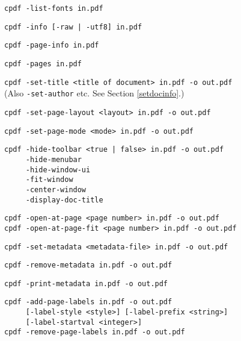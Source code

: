 \documentclass{book}
\begin{document}
  \begin{framed}
    \small\noindent\verb!cpdf -list-fonts in.pdf!

    \vspace{1.5mm}
    \small\noindent\verb!cpdf -info [-raw | -utf8] in.pdf!

    \vspace{1.5mm}
    \small\noindent\verb!cpdf -page-info in.pdf!

    \vspace{1.5mm}
    \small\noindent\verb!cpdf -pages in.pdf!

    \vspace{1.5mm}
    \small\noindent\verb!cpdf -set-title <title of document> in.pdf -o out.pdf!\\
    (Also \texttt{-set-author} etc. See Section \ref{setdocinfo}.)

    \vspace{1.5mm}
    \small\noindent\verb!cpdf -set-page-layout <layout> in.pdf -o out.pdf!

    \vspace{1.5mm}
    \small\noindent\verb!cpdf -set-page-mode <mode> in.pdf -o out.pdf!

    \vspace{1.5mm} 
    \small\noindent\verb!cpdf -hide-toolbar <true | false> in.pdf -o out.pdf!\\
    \noindent\verb!     -hide-menubar!\\
    \noindent\verb!     -hide-window-ui!\\
    \noindent\verb!     -fit-window!\\
    \noindent\verb!     -center-window!\\
    \noindent\verb!     -display-doc-title!
    
    \vspace{1.5mm}
    \small\noindent\verb!cpdf -open-at-page <page number> in.pdf -o out.pdf!\\
    \noindent\verb!cpdf -open-at-page-fit <page number> in.pdf -o out.pdf!

    \vspace{1.5mm}
    \small\noindent\verb!cpdf -set-metadata <metadata-file> in.pdf -o out.pdf!

    \vspace{1.5mm}
    \small\noindent\verb!cpdf -remove-metadata in.pdf -o out.pdf!

    \vspace{1.5mm}
    \small\noindent\verb!cpdf -print-metadata in.pdf -o out.pdf!
    
    \vspace{1.5mm}
    \small\noindent\verb!cpdf -add-page-labels in.pdf -o out.pdf!\\
    \noindent\verb!     [-label-style <style>] [-label-prefix <string>]!\\
    \noindent\verb!     [-label-startval <integer>]!\\
    
    \vspace{1.5mm}
    \small\noindent\verb!cpdf -remove-page-labels in.pdf -o out.pdf!
  \end{framed}
\end{document}
